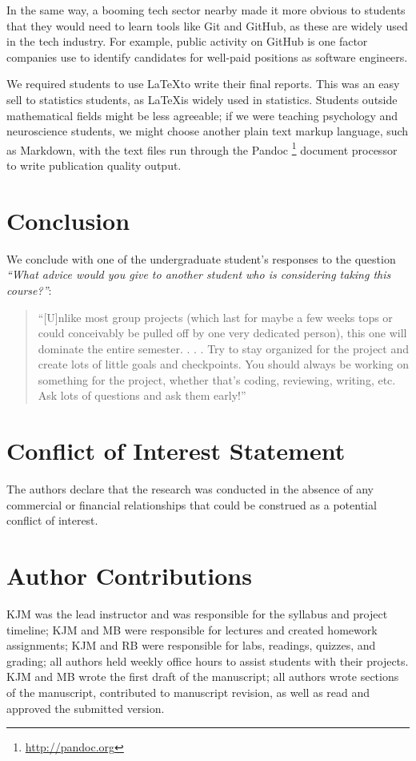 In the same way, a booming tech sector nearby made it more obvious to students
that they would need to learn tools like Git and GitHub, as these are widely
used in the tech industry.  For example, public activity on GitHub is one
factor companies use to identify candidates for well-paid positions as
software engineers.

We required students to use \LaTeX to write their final reports.  This was an
easy sell to statistics students, as \LaTeX is widely used in statistics.
Students outside mathematical fields might be less agreeable; if we were
teaching psychology and neuroscience students, we might choose
another plain text markup language, such as Markdown, with the text files run
through the Pandoc \footnote{\url{http://pandoc.org}} document processor to
write publication quality output.

\section{Conclusion}\label{conclusion}

We conclude with one of the undergraduate student's responses to the question
\emph{``What advice would you give to another student who is considering taking this course?''}:
\begin{quotation}
``[U]nlike most group projects (which last for maybe a few weeks tops or
could conceivably be pulled off by one very dedicated person), this one will
dominate the entire semester. . . . Try to stay organized for the project and
create lots of little goals and checkpoints. You should always be working on
something for the project, whether that's coding, reviewing, writing, etc. Ask
lots of questions and ask them early!''
\end{quotation}

\section*{Conflict of Interest Statement}

The authors declare that the research was conducted in the absence of any
commercial or financial relationships that could be construed as a potential
conflict of interest.

\section*{Author Contributions}

KJM was the lead instructor and was responsible for the syllabus and project timeline;
KJM and MB were responsible for lectures and created homework assignments;
KJM and RB were responsible for labs, readings, quizzes, and grading;
all authors held weekly office hours to assist students with their projects.
KJM and MB wrote the first draft of the manuscript;
all authors wrote sections of the manuscript, contributed to manuscript revision, 
as well as read and approved the submitted version.
